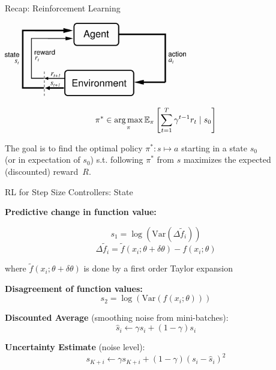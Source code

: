 \begin{frame}[c]{Recap: Reinforcement Learning }

\begin{center}
\includegraphics[width=0.6\textwidth]{images/suttonbarto_rl.png}
\end{center}

\pause

\begin{eqnarray}
\pi^* \in \operatorname*{arg\,max}_{\pi} \mathbb{E}_{\pi} \left[ \sum^{T}_{t=1} \gamma^{t-1} r_t \mid s_0 \right] \nonumber
\end{eqnarray}

The goal is to find the optimal policy $\pi^{*}: s \mapsto a$ starting in a state $s_0$\\ (or in expectation of $s_0$) s.t. following $\pi^{*}$ from $s$ maximizes the expected (discounted) reward~$R$.


\end{frame}
\begin{frame}[c]{RL for Step Size Controllers: State }

\textbf{Predictive change in function value:}

$$s_1 = \log \left( \text{Var}(\Delta \tilde{f}_i ) \right)$$
$$\Delta \tilde{f}_i = \tilde{f}(x_i; \theta + \delta \theta) - f(x_i; \theta)$$

where $\tilde{f}(x_i; \theta + \delta \theta)$ is done by a first order Taylor expansion

\pause
\textbf{Disagreement of function values:}
$$ s_2 = \log \left(\text{Var}(f(x_i; \theta)) \right)$$

\pause

\textbf{Discounted Average} (smoothing noise from mini-batches):
$$\hat{s}_i \leftarrow \gamma \hat{s_i} + (1 - \gamma) s_i$$

\pause

\textbf{Uncertainty Estimate} (noise level):
$$s_{K+i} \leftarrow \gamma s_{K+i} + (1-\gamma) (s_i - \hat{s}_i)^2$$


\end{frame}
